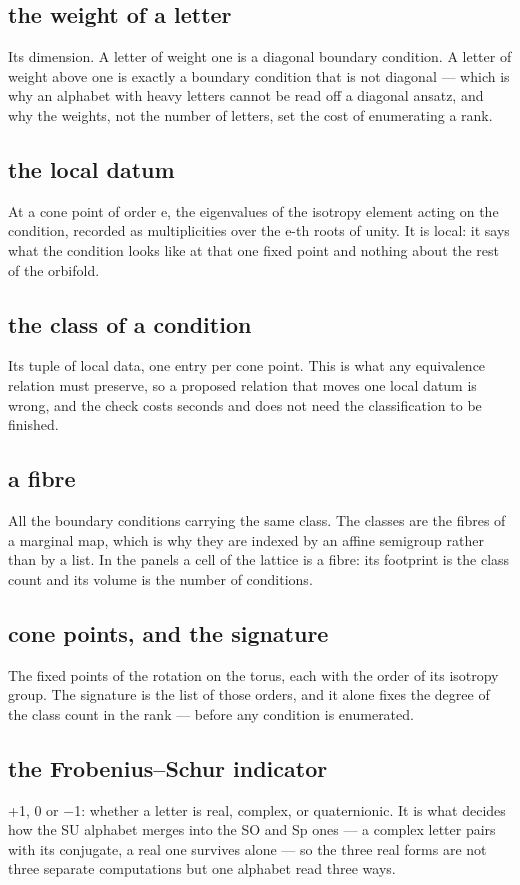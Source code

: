 \documentclass[11pt,a4paper]{article}
\begin{document}
\subsection*{the weight of a letter}
Its dimension. A letter of weight one is a diagonal boundary condition. A letter of weight above one is exactly a boundary condition that is not diagonal --- which is why an alphabet with heavy letters cannot be read off a diagonal ansatz, and why the weights, not the number of letters, set the cost of enumerating a rank.

\subsection*{the local datum}
At a cone point of order e, the eigenvalues of the isotropy element acting on the condition, recorded as multiplicities over the e-th roots of unity. It is local: it says what the condition looks like at that one fixed point and nothing about the rest of the orbifold.

\subsection*{the class of a condition}
Its tuple of local data, one entry per cone point. This is what any equivalence relation must preserve, so a proposed relation that moves one local datum is wrong, and the check costs seconds and does not need the classification to be finished.

\subsection*{a fibre}
All the boundary conditions carrying the same class. The classes are the fibres of a marginal map, which is why they are indexed by an affine semigroup rather than by a list. In the panels a cell of the lattice is a fibre: its footprint is the class count and its volume is the number of conditions.

\subsection*{cone points, and the signature}
The fixed points of the rotation on the torus, each with the order of its isotropy group. The signature is the list of those orders, and it alone fixes the degree of the class count in the rank --- before any condition is enumerated.

\subsection*{the Frobenius--Schur indicator}
+1, 0 or \ensuremath{-}1: whether a letter is real, complex, or quaternionic. It is what decides how the SU alphabet merges into the SO and Sp ones --- a complex letter pairs with its conjugate, a real one survives alone --- so the three real forms are not three separate computations but one alphabet read three ways.
\end{document}
